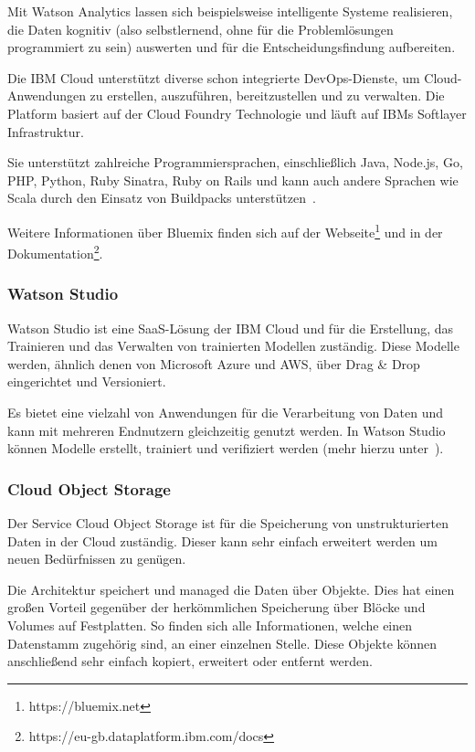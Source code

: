 Mit Watson Analytics lassen sich beispielsweise intelligente Systeme realisieren, die Daten kognitiv (also selbstlernend,
ohne für die Problemlösungen programmiert zu sein) auswerten und für die Entscheidungsfindung aufbereiten.

Die IBM Cloud unterstützt diverse schon integrierte DevOps-Dienste, um Cloud-Anwendungen zu erstellen, auszuführen,
bereitzustellen und zu verwalten. Die Platform basiert auf der Cloud Foundry Technologie und läuft auf IBMs
Softlayer Infrastruktur.

Sie unterstützt zahlreiche Programmiersprachen, einschließlich Java, Node.js, Go, PHP, Python, Ruby Sinatra, Ruby on
Rails und kann auch andere Sprachen wie Scala durch den Einsatz von Buildpacks unterstützen~\cite{book_grundlagen_bluemix}.

Weitere Informationen über Bluemix finden sich auf der Webseite\footnote{https://bluemix.net} und in der
Dokumentation\footnote{https://eu-gb.dataplatform.ibm.com/docs}.

\subsubsection{Watson Studio}
Watson Studio ist eine SaaS-Lösung der IBM Cloud und für die Erstellung, das Trainieren und das Verwalten von trainierten
Modellen zuständig. Diese Modelle werden, ähnlich denen von Microsoft Azure und AWS, über Drag \& Drop eingerichtet
und Versioniert.

Es bietet eine vielzahl von Anwendungen für die Verarbeitung von Daten und kann mit mehreren Endnutzern gleichzeitig
genutzt werden. In Watson Studio können Modelle erstellt, trainiert und verifiziert werden (mehr hierzu
unter~\cite{online_grundlagen_watson_studio}).

\subsubsection{Cloud Object Storage}
Der Service Cloud Object Storage ist für die Speicherung von unstrukturierten Daten in der Cloud zuständig. Dieser kann
sehr einfach erweitert werden um neuen Bedürfnissen zu genügen.

Die Architektur speichert und managed die Daten über Objekte. Dies hat einen großen Vorteil gegenüber der herkömmlichen
Speicherung über Blöcke und Volumes auf Festplatten. So finden sich alle Informationen, welche einen Datenstamm zugehörig
sind, an einer einzelnen Stelle. Diese Objekte können anschließend sehr einfach kopiert, erweitert oder entfernt werden.

